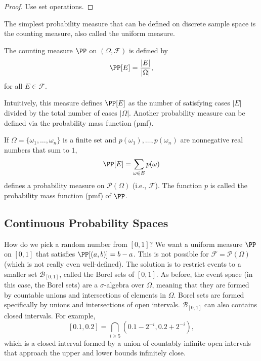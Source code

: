 \begin{proof}
Use set operations.
\end{proof}

The simplest probability measure that can  be defined on discrete sample space is the \ac{counting measure}, also called the \ac{uniform measure}. 

\begin{definition}

The \ac{counting measure} $\PP$ on $(\Omega, \mathcal{F})$ is defined by
\[\PP[E] = \frac{\vert E\vert}{\vert \Omega\vert},\]
for all $E\in \mathcal{F}$.
\end{definition}

Intuitively, this measure defines $\PP[E]$ as the number of satisfying cases $\vert E\vert$ divided by the total number of cases $\vert \Omega\vert$. Another probability measure can be defined via the probability mass function (pmf). 

\begin{definition}

If $\Omega = \{\omega_1, \hdots, \omega_n\}$ is a finite set and $p(\omega_1), \hdots, p(\omega_n)$ are nonnegative real numbers that sum to $1$, 
\[\PP[E] = \sum_{\omega \in E}p(\omega)\]
defines a probability measure on $\mathcal{P}(\Omega)$ (i.e., $\mathcal{F}$). The function $p$ is called the \ac{probability mass function} (pmf) of $\PP$. 
\end{definition}

\subsection{Continuous Probability Spaces}
How do we pick a random number from $[0,1]$? We want a uniform measure $\PP$ on $[0,1]$ that satisfies $\PP[(a,b)] = b-a$. This is not possible for $\mathcal{F} = \mathcal{P}(\Omega)$ (which is not really even well-defined). The solution is to restrict events to a smaller set $\mathcal{B}_{[0,1]}$, called the \ac{Borel sets} of $[0,1]$. As before, the event space (in this case, the Borel sets) are a $\sigma$-algebra over $\Omega$, meaning that they are formed by countable unions and intersections of elements in $\Omega$. Borel sets are formed specifically by unions and intersections of open intervals. $\mathcal{B}_{[0,1]}$ can also contains closed intervals. For example, 
\[[0.1, 0.2] = \bigcap_{i\geq 5} (0.1 - 2^{-i}, 0.2+2^{-i}),\]
which is a closed interval formed by a union of countably infinite open intervals that approach the upper and lower bounds infinitely close. 

